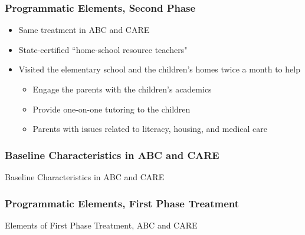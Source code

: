 \documentclass[static]{JJH-Beamer}
\begin{document}

\begin{frame}
\frametitle{Programmatic Elements, Second Phase}\label{elements}
\begin{itemize}	
	\item Same treatment in ABC and CARE
	\item State-certified ``home-school resource teachers" 
	\item Visited the elementary school and the children's homes twice a month to help
		\begin{itemize}
			\item Engage the parents with the children's academics
			\item Provide one-on-one tutoring to the children
			\item Parents with issues related to literacy, housing, and medical care
		\end{itemize}
\end{itemize}
\hyperlink{first_phase}{}
\end{frame}


\begin{frame}
\frametitle{Baseline Characteristics in ABC and CARE}
\label{baseline_abccare}
	\begin{center}
	\begin{table}
	\caption{Baseline Characteristics in ABC and CARE}
	\scalebox{0.7}{}
	\end{table}
	\end{center}
\hyperlink{sample}{}
\end{frame}


\begin{frame}
\frametitle{Programmatic Elements, First Phase Treatment}
\label{first_phase}
	\begin{table}
		\caption{Elements of First Phase Treatment, ABC and CARE}
	\scalebox{0.55}{}
	\end{table}
\end{frame}

\end{document}
